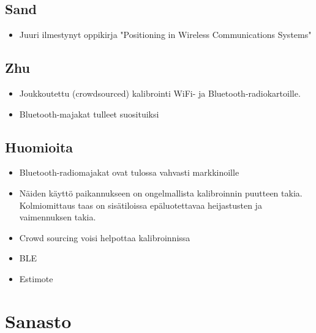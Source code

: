 \documentclass[a4paper]{scrartcl}
\begin{document}
\subsection{Sand\cite{sand2014positioning}}
\begin{itemize}
  \item Juuri ilmestynyt oppikirja "Positioning in Wireless Communications
    Systems"
\end{itemize}

\subsection{Zhu\cite{zhu2012improving}}
\begin{itemize}
  \item Joukkoutettu (crowdsourced) kalibrointi WiFi- ja
    Bluetooth-radiokartoille.
  \item Bluetooth-majakat tulleet suosituiksi
\end{itemize}

\subsection{Huomioita}
\begin{itemize}
	\item Bluetooth-radiomajakat ovat tulossa vahvasti markkinoille
	\item Näiden käyttö paikannukseen on ongelmallista kalibroinnin puutteen
		takia. Kolmiomittaus taas on sisätiloissa epäluotettavaa heijastusten
		ja vaimennuksen takia.
	\item Crowd sourcing voisi helpottaa kalibroinnissa
	\item BLE
	\item Estimote
\end{itemize}

\section{Sanasto}

\glsaddall
\printglossary
\glsaddall
\printglossary[type=\acronymtype,title=Lyhenteet]



\end{document}
